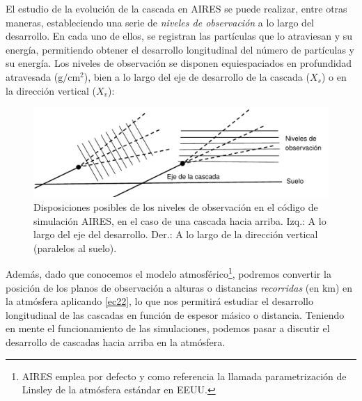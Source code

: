 \documentclass[11 pt, a4paper]{article} %
\numberwithin{equation}{section}
\numberwithin{figure}{section}
\numberwithin{table}{section}
\begin{document}
El estudio de la evolución de la cascada en AIRES se puede realizar, entre otras maneras, estableciendo una serie de \textit{niveles de observación} a lo largo del desarrollo. En cada uno de ellos, se registran las partículas que lo atraviesan y su energía, permitiendo obtener el desarrollo longitudinal del número de partículas y su energía. Los niveles de observación se disponen equiespaciados en profundidad atravesada ($\mathrm{g/cm^2}$), bien a lo largo del eje de desarrollo de la cascada ($X_s$) o en la dirección vertical ($X_v$):
	\begin{figure}[H]
		\centering
		\includegraphics[width=.7\linewidth]{figures/cascadas/AIRES_planos_v2}
		\caption{Disposiciones posibles de los niveles de observación en el código de simulación AIRES, en el caso de una cascada hacia arriba. Izq.: A lo largo del eje del desarrollo. Der.: A lo largo de la dirección vertical (paralelos al suelo).}
		\label{AIRES_planos}
	\end{figure}
	
Además, dado que conocemos el modelo atmosférico\footnote{ AIRES emplea por defecto y como referencia la llamada parametrización de Linsley de la atmósfera estándar en EEUU.}, podremos convertir la posición de los planos de observación a alturas o distancias \textit{recorridas} (en $\mathrm{km}$) en la atmósfera aplicando \eqref{ec22}, lo que nos permitirá estudiar el desarrollo longitudinal de las cascadas en función de espesor másico o distancia. Teniendo en mente el funcionamiento de las simulaciones, podemos pasar a discutir el desarrollo de cascadas hacia arriba en la atmósfera.
\end{document}
